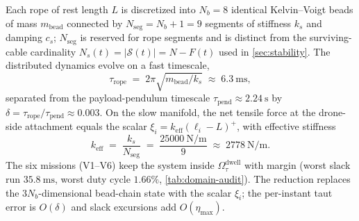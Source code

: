 \documentclass[lettersize,journal]{IEEEtran}
\begin{document}
Each rope of rest length $L$ is discretized into $N_b = 8$ identical Kelvin--Voigt beads of mass $m_{\mathrm{bead}}$ connected by $N_{\mathrm{seg}} = N_b + 1 = 9$ segments of stiffness $k_s$ and damping $c_s$; $N_{\mathrm{seg}}$ is reserved for rope segments and is distinct from the surviving-cable cardinality $N_s(t) = |\mathcal{S}(t)| = N - F(t)$ used in \cref{sec:stability}. The distributed dynamics evolve on a fast timescale,
\begin{equation}
  \tau_{\mathrm{rope}}
    \;=\; 2\pi\sqrt{m_{\mathrm{bead}}/k_s}
    \;\approx\; \SI{6.3}{\milli\second},
  \label{eq:tau-rope}
\end{equation}
separated from the payload-pendulum timescale $\tau_{\mathrm{pend}} \approx \SI{2.24}{\second}$ by $\delta = \tau_{\mathrm{rope}} / \tau_{\mathrm{pend}} \approx 0.003$. On the slow manifold, the net tensile force at the drone-side attachment equals the scalar $\xi_i = k_{\mathrm{eff}}(\ell_i - L)^+$, with effective stiffness
\begin{equation}
 k_{\mathrm{eff}}
    \;=\; \frac{k_s}{N_{\mathrm{seg}}}
    \;=\; \frac{\SI{25000}{\newton\per\metre}}{9}
    \;\approx\; \SI{2778}{\newton\per\metre}.
  \label{eq:keff}
\end{equation}
The six missions (V1--V6) keep the system inside $\Omega_\tau^{\mathrm{dwell}}$ with margin (worst slack run $\SI{35.8}{\milli\second}$, worst duty cycle $1.66\%$, \cref{tab:domain-audit}). The reduction replaces the $3N_b$-dimensional bead-chain state with the scalar $\xi_i$; the per-instant taut error is $O(\delta)$ and slack excursions add $O(\eta_{\max})$.
\end{document}
